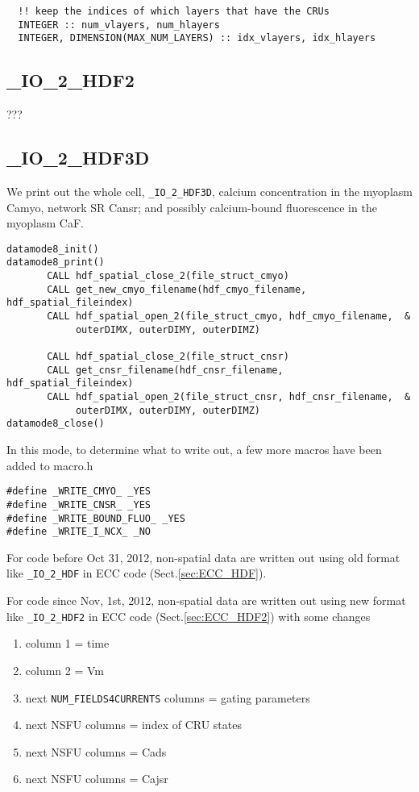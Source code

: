 \begin{verbatim}
  !! keep the indices of which layers that have the CRUs
  INTEGER :: num_vlayers, num_hlayers
  INTEGER, DIMENSION(MAX_NUM_LAYERS) :: idx_vlayers, idx_hlayers
\end{verbatim}

\subsection{\_IO\_2\_HDF2}

???

\subsection{\_IO\_2\_HDF3D}

We print out the whole cell, \verb!_IO_2_HDF3D!, calcium concentration in the
myoplasm Camyo, network SR Cansr; and possibly calcium-bound fluorescence in the
myoplasm CaF.
\begin{verbatim}
datamode8_init()
datamode8_print()
       CALL hdf_spatial_close_2(file_struct_cmyo)
       CALL get_new_cmyo_filename(hdf_cmyo_filename, hdf_spatial_fileindex)
       CALL hdf_spatial_open_2(file_struct_cmyo, hdf_cmyo_filename,  &
            outerDIMX, outerDIMY, outerDIMZ)

       CALL hdf_spatial_close_2(file_struct_cnsr)
       CALL get_cnsr_filename(hdf_cnsr_filename, hdf_spatial_fileindex)
       CALL hdf_spatial_open_2(file_struct_cnsr, hdf_cnsr_filename,  &
            outerDIMX, outerDIMY, outerDIMZ)
datamode8_close()
\end{verbatim}

In this mode, to determine what to write out, a few more macros have been added
to macro.h
\begin{verbatim}
#define _WRITE_CMYO_ _YES
#define _WRITE_CNSR_ _YES
#define _WRITE_BOUND_FLUO_ _YES
#define _WRITE_I_NCX_ _NO
\end{verbatim}

For code before Oct 31, 2012, non-spatial data are written out using old format
like \verb!_IO_2_HDF! in ECC code (Sect.\ref{sec:ECC_HDF}).

For code since Nov, 1st, 2012, non-spatial data are written out using new format
like \verb!_IO_2_HDF2! in ECC code (Sect.\ref{sec:ECC_HDF2}) with some changes
\begin{enumerate}
  \item column 1 = time
  \item column 2 = Vm
  \item next \verb!NUM_FIELDS4CURRENTS! columns = gating parameters
  \item next NSFU columns = index of CRU states
  \item next NSFU columns = Cads
  \item next NSFU columns = Cajsr
\end{enumerate}

